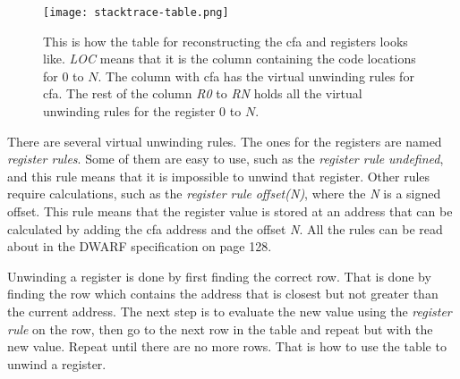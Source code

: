 \begin{figure}[h]
	\centering
	\texttt{[image: stacktrace-table.png]}
	\caption{This is how the table for reconstructing the \gls{cfa} and registers looks like. \emph{LOC} means that it is the column containing the code locations for $0$ to $N$. The column with \gls{cfa} has the virtual unwinding rules for \gls{cfa}. The rest of the column \emph{R0} to \emph{RN} holds all the virtual unwinding rules for the register $0$ to $N$.}
	\label{fig:stacktracetable}
\end{figure}


There are several virtual unwinding rules.
The ones for the registers are named \emph{register rules}.
Some of them are easy to use, such as the \emph{register rule} \emph{undefined}, and this rule means that it is impossible to unwind that register.
Other rules require calculations, such as the \emph{register rule} \emph{offset(N)}, where the \emph{N} is a signed offset.
This rule means that the register value is stored at an address that can be calculated by adding the \gls{cfa} address and the offset \emph{N}.
All the rules can be read about in the \gls{DWARF} specification \cite{dwarf} on page 128.


Unwinding a register is done by first finding the correct row.
That is done by finding the row which contains the address that is closest but not greater than the current address.
The next step is to evaluate the new value using the \emph{register rule} on the row, then go to the next row in the table and repeat but with the new value.
Repeat until there are no more rows.
That is how to use the table to unwind a register.
